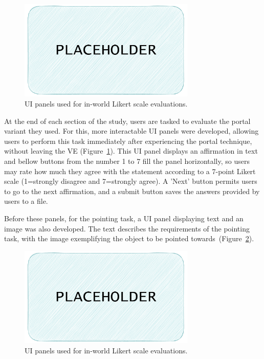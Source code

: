 \begin{figure}[b]
    \centering
     \includegraphics[width=0.75\textwidth]{NOVAthesisFiles/Images/placeholder.pdf}
     \caption[UI panels used for in-world Likert scale evaluations.]
     {UI panels used for in-world Likert scale evaluations.}
     \label{fig:likert-scale-ui}
\end{figure}
At the end of each section of the study, users are tasked to evaluate the portal variant they used. For this, more interactable \gls{UI} panels 
were developed, allowing users to perform this task immediately after experiencing the portal technique, without leaving the \gls{VE} (Figure~\ref{fig:likert-scale-ui}).
This \gls{UI} panel displays an affirmation in text and bellow buttons from the number 1 to 7 fill the panel horizontally, so users may rate 
how much they agree with the statement according to a 7-point Likert scale (1=strongly disagree and 7=strongly agree). A 'Next' button permits 
users to go to the next affirmation, and a submit button saves the answers provided by users to a file.

Before these panels, for the pointing task, a \gls{UI} panel displaying text and an image was also developed. The text describes the requirements 
of the pointing task, with the image exemplifying the object to be pointed towards~(Figure~\ref{fig:pointing-task-ui}).


\begin{figure}[t]
    \centering
     \includegraphics[width=0.75\textwidth]{NOVAthesisFiles/Images/placeholder.pdf}
     \caption[UI panels used for in-world Likert scale evaluations.]
     {UI panels used for in-world Likert scale evaluations.}
     \label{fig:pointing-task-ui}
\end{figure}

